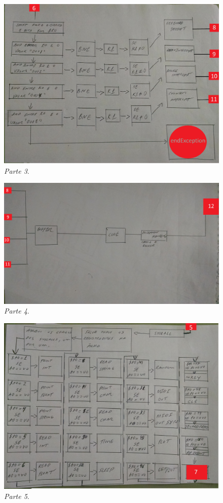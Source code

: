 \documentclass[12pt]{article}
\begin{document}
\begin{figure}[H]
	\flushleft
	\includegraphics[scale=0.14]{imagens/5.jpg}
	\caption{ \textit{Parte 3}.}
	\label{fig:ex1st}
\end{figure}

\begin{figure}[H]
	\flushleft
	\includegraphics[scale=0.11]{imagens/6.jpg}
	\caption{ \textit{Parte 4}.}
	\label{fig:ex1st}
\end{figure}

\begin{figure}[H]
	\flushleft
	\includegraphics[scale=0.14]{imagens/3.jpg}
	\caption{ \textit{Parte 5}.}
	\label{fig:ex1st}
\end{figure}
\end{document}
